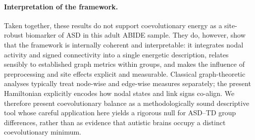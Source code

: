 \documentclass[10pt,letterpaper]{article}
\begin{document}
\paragraph*{Interpretation of the framework.}
Taken together, these results do not support coevolutionary energy as a site-robust biomarker of ASD
in this adult ABIDE sample. They do, however, show that the framework is internally coherent and
interpretable: it integrates nodal activity and signed connectivity into a single energetic
description, relates sensibly to established graph metrics within groups, and makes the influence of
preprocessing and site effects explicit and measurable. Classical graph-theoretic analyses typically
treat node-wise and edge-wise measures separately; the present Hamiltonian explicitly encodes how
nodal states and link signs co-align. We therefore present coevolutionary balance as a
methodologically sound descriptive tool whose careful application here yields a rigorous null for
ASD--TD group differences, rather than as evidence that autistic brains occupy a distinct
coevolutionary minimum.
\end{document}
